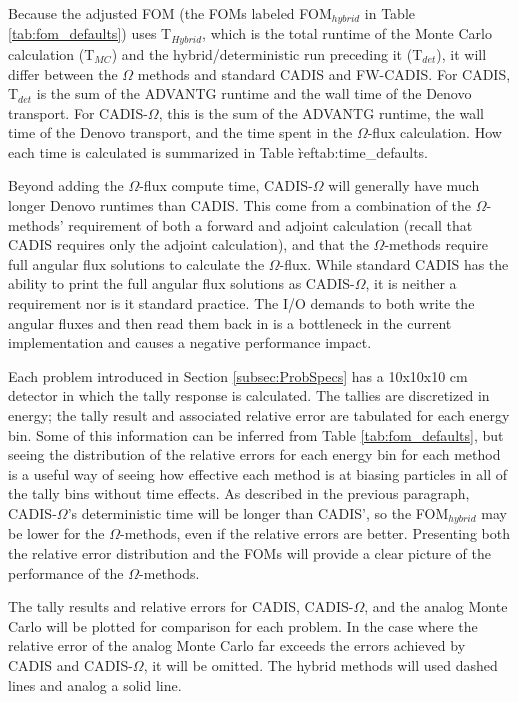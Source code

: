 Because the adjusted FOM (the FOMs labeled FOM$_{hybrid}$ in Table
\ref{tab:fom_defaults}) uses T$_{Hybrid}$, which is the total runtime of the
Monte Carlo calculation (T$_{MC}$) and the hybrid/deterministic run preceding it
(T$_{det}$), it will differ between
the $\Omega$ methods and standard CADIS and FW-CADIS. For CADIS, T$_{det}$ is
the sum of the ADVANTG runtime and the wall time of the Denovo transport. For
CADIS-$\Omega$, this is the sum of the ADVANTG runtime, the wall time of the
Denovo transport, and the time spent in the $\Omega$-flux calculation. How each
time is calculated is summarized in Table \`ref{tab:time_defaults}.

Beyond
adding the $\Omega$-flux compute time, CADIS-$\Omega$ will generally have much
longer Denovo runtimes than CADIS. This come from a combination of the $\Omega$-methods'
requirement of both a forward and adjoint calculation (recall that CADIS
requires only the adjoint calculation), and that the $\Omega$-methods require
full angular flux solutions to calculate the $\Omega$-flux. While standard CADIS
has the ability to print the full angular flux solutions as CADIS-$\Omega$, it
is neither a requirement nor is it standard practice. The I/O demands to both write
the angular fluxes and then read them back in is a bottleneck in the
current implementation and causes a negative performance impact.

Each problem introduced in Section \ref{subsec:ProbSpecs} has a
10x10x10 cm detector in which the tally response is calculated. The tallies are
discretized in energy; the tally result and associated relative error are
tabulated for each energy bin. Some of this information can be inferred from Table
\ref{tab:fom_defaults},
but seeing the distribution of the relative errors for each energy
bin for each method is a useful way of seeing how effective each method is at
biasing particles in all of the tally bins
without time effects. As described in the previous paragraph, CADIS-$\Omega$'s
deterministic time will be longer than CADIS', so the FOM$_{hybrid}$ may be
lower for the $\Omega$-methods, even if the relative errors are better.
Presenting both the relative error distribution and the FOMs will provide a clear
picture of the performance of the $\Omega$-methods.

The tally results and relative errors for CADIS,
CADIS-$\Omega$, and the analog Monte Carlo will be
plotted for comparison for each problem.
In the case where the
relative error of the analog Monte Carlo far exceeds the errors
achieved by CADIS and CADIS-$\Omega$, it will be omitted. %
The hybrid methods
will used dashed lines and analog a solid line.

